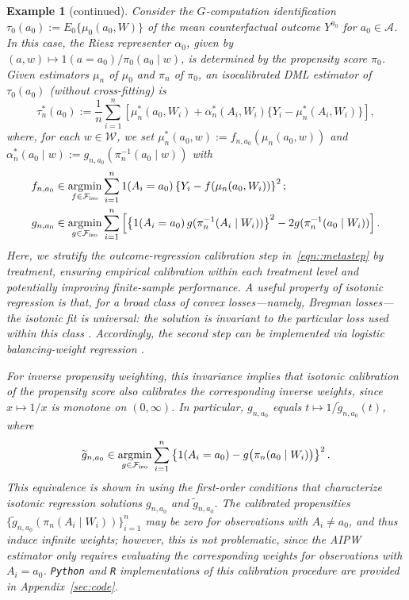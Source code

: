 \documentclass[11pt]{article}
\theoremstyle{plain}
\newtheorem{example}{Example}
\DeclareMathOperator*{\argmin}{argmin}
\begin{document}
\begin{example}[continued]
\label{example::ATE}
Consider the $G$-computation identification $\tau_0(a_0) := E_0\{\mu_0(a_0, W)\}$
of the mean counterfactual outcome $Y^{a_0}$ for $a_0 \in \mathcal{A}$. In this
case, the Riesz representer $\alpha_0$, given by $(a,w) \mapsto
1(a = a_0)/\pi_0(a_0 \mid w)$, is determined by the propensity score $\pi_0$.
Given estimators $\mu_n$ of $\mu_0$ and $\pi_n$ of $\pi_0$, an isocalibrated DML
estimator of $\tau_0(a_0)$ (without cross-fitting) is
\[
\tau_n^*(a_0) := \frac{1}{n}\sum_{i=1}^n \left[\mu_n^*(a_0, W_i) +
\alpha_n^*(A_i,W_i)\{Y_i - \mu_n^*(A_i, W_i)\}\right],
\]
where, for each $w\in\mathcal{W}$, we set $\mu_n^*(a_0, w) :=
f_{n,a_0}(\mu_n(a_0 ,w))$ and $\alpha_n^*(a_0 \mid w) :=
g_{n,a_0}(\pi_n^{-1}(a_0 \mid w))$ with
\begin{align*}
   f_{n,a_0} &\in \argmin_{f \in \mathcal{F}_{\textnormal{iso}}}
   \sum_{i=1}^n 1(A_i=a_0)\left\{ Y_i - f(\mu_n(a_0, W_i))\right\}^2;\\
   g_{n,a_0} &\in \argmin_{g \in \mathcal{F}_{\textnormal{iso}}}
   \sum_{i=1}^n\left[\left\{1(A_i=a_0)\, g(\pi_n^{-1}(A_i \mid W_i))\right\}^2
   - 2 g(\pi_n^{-1}(a_0 \mid W_i)) \right]. 
\end{align*}
Here, we stratify the outcome-regression calibration step in~\eqref{eqn::metastep}
by treatment, ensuring empirical calibration within each treatment level and
potentially improving finite-sample performance.  A useful property of isotonic regression is that, for a broad class of convex
losses---namely, Bregman losses---the isotonic fit is \emph{universal}: the
solution is invariant to the particular loss used within this class
\citep{jordan2022characterizing}. Accordingly, the second step can be
implemented via logistic balancing-weight regression \citep{sverdrup2026balnet}.

For inverse propensity weighting, this invariance implies that isotonic
calibration of the propensity score also calibrates the corresponding inverse
weights, since \(x \mapsto 1/x\) is monotone on \((0,\infty)\). In particular,
$g_{n,a_0}$ equals $t \mapsto 1/\widetilde{g}_{n,a_0}(t)$, where
\begin{align*}
   \widetilde{g}_{n,a_0} \in \argmin_{g \in \mathcal{F}_{\textnormal{iso}}}
   \sum_{i=1}^n \left\{ 1(A_i = a_0) - g\bigl(\pi_n(a_0 \mid W_i)\bigr) \right\}^2.
\end{align*}
This equivalence is shown in \cite{van_der_Laan2024stabilized} using the
first-order conditions that characterize isotonic regression solutions
$g_{n,a_0}$ and $\widetilde{g}_{n,a_0}$. The calibrated propensities
\(\{\widetilde{g}_{n,a_0}(\pi_n(A_i \mid W_i))\}_{i=1}^n\) may be zero for
observations with \(A_i \neq a_0\), and thus induce infinite weights; however,
this is not problematic, since the AIPW estimator only requires evaluating the
corresponding weights for observations with \(A_i = a_0\). \texttt{Python} and
\texttt{R} implementations of this calibration procedure are provided in
Appendix~\ref{sec:code}.
\end{example}
\end{document}
